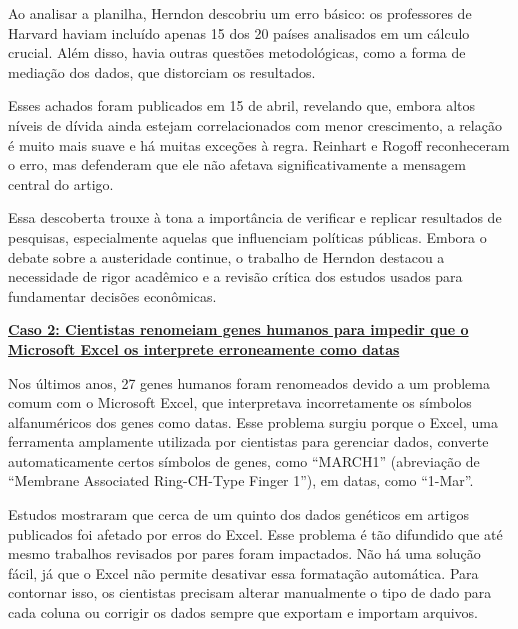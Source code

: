 \documentclass[
  a4paper,
]{book}
\begin{document}
\begin{tcolorbox}
Ao analisar a planilha, Herndon descobriu um erro básico: os professores
de Harvard haviam incluído apenas 15 dos 20 países analisados em um
cálculo crucial. Além disso, havia outras questões metodológicas, como a
forma de mediação dos dados, que distorciam os resultados.\vspace{0.5em}

Esses achados foram publicados em 15 de abril, revelando que, embora
altos níveis de dívida ainda estejam correlacionados com menor
crescimento, a relação é muito mais suave e há muitas exceções à regra.
Reinhart e Rogoff reconheceram o erro, mas defenderam que ele não
afetava significativamente a mensagem central do artigo.\vspace{0.5em}

Essa descoberta trouxe à tona a importância de verificar e replicar
resultados de pesquisas, especialmente aquelas que influenciam políticas
públicas. Embora o debate sobre a austeridade continue, o trabalho de
Herndon destacou a necessidade de rigor acadêmico e a revisão crítica
dos estudos usados para fundamentar decisões econômicas.\vspace{0.5em}

\href{https://www.theverge.com/2020/8/6/21355674/human-genes-rename-microsoft-excel-misreading-dates}{\textbf{Caso
2: Cientistas renomeiam genes humanos para impedir que o Microsoft Excel
os interprete erroneamente como datas}}\vspace{1em}

Nos últimos anos, 27 genes humanos foram renomeados devido a um problema
comum com o Microsoft Excel, que interpretava incorretamente os símbolos
alfanuméricos dos genes como datas. Esse problema surgiu porque o Excel,
uma ferramenta amplamente utilizada por cientistas para gerenciar dados,
converte automaticamente certos símbolos de genes, como ``MARCH1''
(abreviação de ``Membrane Associated Ring-CH-Type Finger 1''), em datas,
como ``1-Mar''.\vspace{0.5em}

Estudos mostraram que cerca de um quinto dos dados genéticos em artigos
publicados foi afetado por erros do Excel. Esse problema é tão difundido
que até mesmo trabalhos revisados por pares foram impactados. Não há uma
solução fácil, já que o Excel não permite desativar essa formatação
automática. Para contornar isso, os cientistas precisam alterar
manualmente o tipo de dado para cada coluna ou corrigir os dados sempre
que exportam e importam arquivos.\vspace{0.5em}


\end{tcolorbox}
\end{document}
